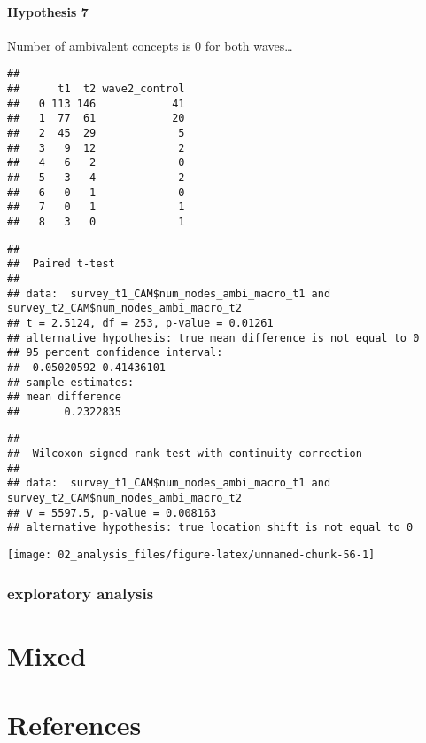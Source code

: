 \documentclass[
]{article}
\begin{document}
\hypertarget{hypothesis-7}{%
\paragraph{Hypothesis 7}\label{hypothesis-7}}

Number of ambivalent concepts is 0 for both waves\ldots{}

\begin{verbatim}
##    
##      t1  t2 wave2_control
##   0 113 146            41
##   1  77  61            20
##   2  45  29             5
##   3   9  12             2
##   4   6   2             0
##   5   3   4             2
##   6   0   1             0
##   7   0   1             1
##   8   3   0             1
\end{verbatim}

\begin{verbatim}
## 
##  Paired t-test
## 
## data:  survey_t1_CAM$num_nodes_ambi_macro_t1 and survey_t2_CAM$num_nodes_ambi_macro_t2
## t = 2.5124, df = 253, p-value = 0.01261
## alternative hypothesis: true mean difference is not equal to 0
## 95 percent confidence interval:
##  0.05020592 0.41436101
## sample estimates:
## mean difference 
##       0.2322835
\end{verbatim}

\begin{verbatim}
## 
##  Wilcoxon signed rank test with continuity correction
## 
## data:  survey_t1_CAM$num_nodes_ambi_macro_t1 and survey_t2_CAM$num_nodes_ambi_macro_t2
## V = 5597.5, p-value = 0.008163
## alternative hypothesis: true location shift is not equal to 0
\end{verbatim}

\begin{center}\texttt{[image: 02\_analysis\_files/figure-latex/unnamed-chunk-56-1]} \end{center}

\hypertarget{exploratory-analysis}{%
\subsubsection{exploratory analysis}\label{exploratory-analysis}}

\hypertarget{mixed}{%
\section{Mixed}\label{mixed}}

\hypertarget{references}{%
\section{References}\label{references}}
\end{document}
